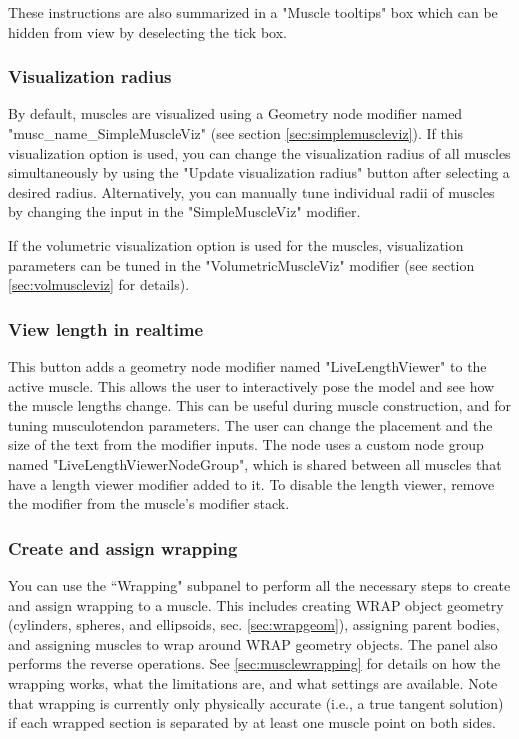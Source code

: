 \documentclass{article}
\begin{document}
These instructions are also summarized in a "Muscle tooltips" box which can be hidden from view by deselecting the tick box.


\subsubsection{Visualization radius}
By default, muscles are visualized using a Geometry node modifier named "musc\_name\_SimpleMuscleViz" (see section \ref{sec:simplemuscleviz}). If this visualization option is used, you can change the visualization radius of all muscles simultaneously by using the "Update visualization radius" button after selecting a desired radius. Alternatively, you can manually tune individual radii of muscles by changing the input in the "SimpleMuscleViz" modifier.

If the volumetric visualization option is used for the muscles, visualization parameters can be tuned in the "VolumetricMuscleViz" modifier (see section \ref{sec:volmuscleviz} for details).

\subsubsection{View length in realtime}

This button adds a geometry node modifier named "LiveLengthViewer" to the active muscle. This allows the user to interactively pose the model and see how the muscle lengths change. This can be useful during muscle construction, and for tuning musculotendon parameters. The user can change the placement and the size of the text from the modifier inputs. %
The node uses a custom node group named "LiveLengthViewerNodeGroup", which is shared between all muscles that have a length viewer modifier added to it. To disable the length viewer, remove the modifier from the muscle's modifier stack.


\subsubsection{Create and assign wrapping}
\label{sec:createassignwrapping}
You can use the ``Wrapping" subpanel to perform all the necessary steps to create and assign wrapping to a muscle. This includes creating WRAP object geometry (cylinders, spheres, and ellipsoids, sec. \ref{sec:wrapgeom}), assigning parent bodies, and assigning muscles to wrap around WRAP geometry objects. The panel also performs the reverse operations. See \ref{sec:musclewrapping} for details on how the wrapping works, what the limitations are, and what settings are available. Note that wrapping is currently only physically accurate (i.e., a true tangent solution) if each wrapped section is separated by at least one muscle point on both sides.
\end{document}
